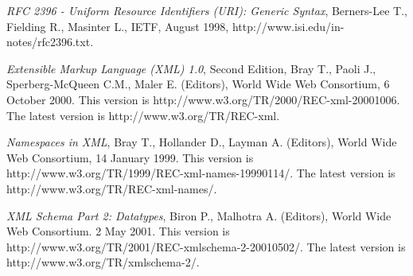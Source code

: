 \documentclass[11pt,a4paper,headsepline, bibtotoc]{scrreprt}
\begin{document}
\begin{thebibliography}{999}
\textit{RFC 2396 - Uniform Resource Identifiers (URI): Generic Syntax}, Berners-Lee T., Fielding R., Masinter L., IETF, August 1998, http://www.isi.edu/in-notes/rfc2396.txt.

\textit{Extensible Markup Language (XML) 1.0}, Second Edition, Bray T., Paoli J., Sperberg-McQueen C.M., Maler E. (Editors), World Wide Web Consortium, 6 October 2000. This version is http://www.w3.org/TR/2000/REC-xml-20001006. The latest version is http://www.w3.org/TR/REC-xml.

\textit{Namespaces in XML}, Bray T., Hollander D., Layman A. (Editors), World Wide Web Consortium, 14 January 1999. This version is http://www.w3.org/TR/1999/REC-xml-names-19990114/. The latest version is http://www.w3.org/TR/REC-xml-names/.

\textit{XML Schema Part 2: Datatypes}, Biron P., Malhotra A. (Editors), World Wide Web Consortium. 2 May 2001. This version is http://www.w3.org/TR/2001/REC-xmlschema-2-20010502/. The latest version is http://www.w3.org/TR/xmlschema-2/.

\end{thebibliography}

\appendix
\end{document}

